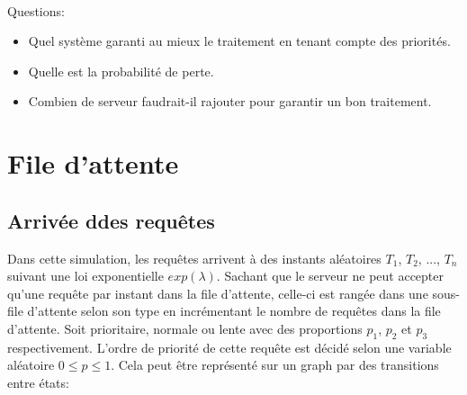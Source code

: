 \documentclass[12pt,a4paper]{article}
\begin{document}
        \paragraph{}
        Questions:
        \begin{itemize}
            \item Quel système garanti au mieux le traitement en tenant compte des priorités.
            \item Quelle est la probabilité de perte.
            \item Combien de serveur faudrait-il rajouter pour garantir un bon traitement.
        \end{itemize}
        
    
    \newpage{}
    \section{File d'attente}
        
        \subsection{Arrivée ddes requêtes}

        \par Dans cette simulation, les requêtes arrivent à des instants aléatoires $T_1$, $T_2$, ..., $T_n$ suivant une loi exponentielle $exp(\lambda)$.\newline
        Sachant que le serveur ne peut accepter qu'une requête par instant dans la file d'attente, celle-ci est rangée dans une sous-file d'attente selon son type en incrémentant le nombre de requêtes dans la file d'attente.
        Soit prioritaire, normale ou lente avec des proportions $p_1$, $p_2$ et $p_3$ respectivement.\newline
        L'ordre de priorité de cette requête est décidé selon une variable aléatoire $0\leq p\leq 1$.
        Cela peut être représenté sur un graph par des transitions entre états: 
        
\end{document}
